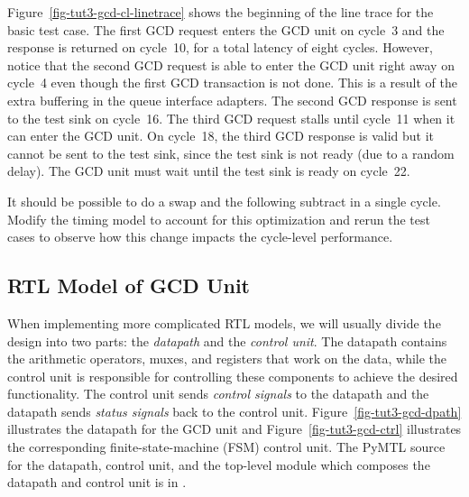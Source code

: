 \documentclass{cbxdoc}
\begin{document}
Figure~\ref{fig-tut3-gcd-cl-linetrace} shows the beginning of the line
trace for the basic test case. The first GCD request enters the GCD unit
on cycle~3 and the response is returned on cycle~10, for a total latency
of eight cycles. However, notice that the second GCD request is able to
enter the GCD unit right away on cycle~4 even though the first GCD
transaction is not done. This is a result of the extra buffering in the
queue interface adapters. The second GCD response is sent to the test
sink on cycle~16. The third GCD request stalls until cycle~11 when it can
enter the GCD unit. On cycle~18, the third GCD response is valid but it
cannot be sent to the test sink, since the test sink is not ready (due to
a random delay). The GCD unit must wait until the test sink is ready on
cycle~22.

\begin{task}
  It should be possible to do a swap and the following subtract in a
  single cycle. Modify the timing model to account for this optimization
  and rerun the test cases to observe how this change impacts the
  cycle-level performance.
\end{task}



\afterpage{\clearpage}

\newpage
\subsection{RTL Model of GCD Unit}

When implementing more complicated RTL models, we will usually divide the
design into two parts: the \emph{datapath} and the \emph{control unit}.
The datapath contains the arithmetic operators, muxes, and registers that
work on the data, while the control unit is responsible for controlling
these components to achieve the desired functionality. The control unit
sends \emph{control signals} to the datapath and the datapath sends
\emph{status signals} back to the control unit.
Figure~\ref{fig-tut3-gcd-dpath} illustrates the datapath for the GCD unit
and Figure~\ref{fig-tut3-gcd-ctrl} illustrates the corresponding
finite-state-machine (FSM) control unit. The PyMTL source for the
datapath, control unit, and the top-level module which composes the
datapath and control unit is in .
\end{document}
